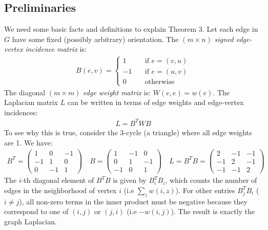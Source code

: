 \documentclass{article}
\begin{document}
\subsection{Preliminaries}

We need some basic facts and definitions to explain Theorem 3. Let each edge
in $G$ have some fixed (possibly arbitrary) orientation. The $(m \times n)$
\textit{signed edge-vertex incidence matrix} is:
\begin{align*}
    B(e, v) =
    \begin{cases}
        1 \quad &\text{if } e = (v, u) \\
        -1 \quad &\text{if } e = (u, v) \\
        0 \quad &\text{otherwise}
    \end{cases}
\end{align*}
The diagonal $(m \times m)$ \textit{edge weight matrix} is: $W(e, e) =
w(e)$. The Laplacian matrix $L$ can be written in terms of edge weights
and edge-vertex incidences:
\begin{align*}
    L = B^TWB
\end{align*}
To see why this is true, consider the 3-cycle (a triangle) where all edge
weights are 1. We have:
\begin{align*}
    B^T =
    \begin{pmatrix}
        1 & 0 & -1 \\
        -1 & 1 & 0 \\
        0 & -1 & 1
    \end{pmatrix} \quad
    B =
    \begin{pmatrix}
        1 & -1 & 0 \\
        0 & 1 & -1 \\
        -1 & 0 & 1
    \end{pmatrix} \quad
    L = B^TB =
    \begin{pmatrix}
        2 & -1 & -1 \\
        -1 & 2 & -1 \\
        -1 & -1 & 2
    \end{pmatrix}
\end{align*}
The $i$-th diagonal element of $B^TB$ is given by $B^T_iB_i$, which counts
the number of edges in the neighborhood of vertex $i$ (i.e $\sum_z w(i,
z)$). For other entries $B^T_jB_i$ ($i \not= j$), all non-zero terms in the
inner product must be negative because they correspond to one of $(i, j)$ or
$(j, i)$ (i.e $-w(i, j)$). The result is exactly the graph Laplacian.
\end{document}

